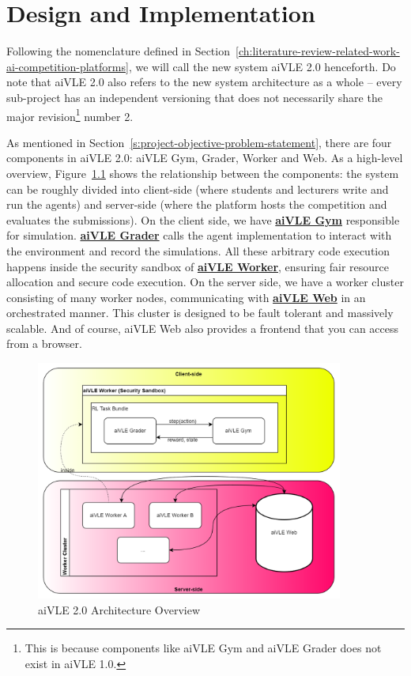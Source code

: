 \chapter{Design and Implementation}
\label{ch:design-and-impl}
Following the nomenclature defined in Section~\ref{ch:literature-review-related-work-ai-competition-platforms}, we will call the new system aiVLE 2.0 henceforth. Do note that aiVLE 2.0 also refers to the new system architecture as a whole – every sub-project has an independent versioning that does not necessarily share the major revision\footnote{This is because components like aiVLE Gym and aiVLE Grader does not exist in aiVLE 1.0.} number 2. 

As mentioned in Section~\ref{s:project-objective-problem-statement}, there are four components in aiVLE 2.0: aiVLE Gym, Grader, Worker and Web. As a high-level overview, Figure~\ref{fig:architecture-overview} shows the relationship between the components: the system can be roughly divided into client-side (where students and lecturers write and run the agents) and server-side (where the platform hosts the competition and evaluates the submissions). On the client side, we have \hyperref[ch:aivle-gym]{\textbf{aiVLE Gym}} responsible for simulation. \hyperref[ch:aivle-grader]{\textbf{aiVLE Grader}} calls the agent implementation to interact with the environment and record the simulations. All these arbitrary code execution happens inside the security sandbox of \hyperref[ch:aivle-worker]{\textbf{aiVLE Worker}}, ensuring fair resource allocation and secure code execution. On the server side, we have a worker cluster consisting of many worker nodes, communicating with \hyperref[ch:aivle-web]{\textbf{aiVLE Web}} in an orchestrated manner. This cluster is designed to be fault tolerant and massively scalable. And of course, aiVLE Web also provides a frontend that you can access from a browser.

\begin{figure}[H]
    \centering
    \includegraphics[width=0.9\textwidth]{images/architecture-overview.png}
    \caption{aiVLE 2.0 Architecture Overview}
    \label{fig:architecture-overview}
\end{figure}

